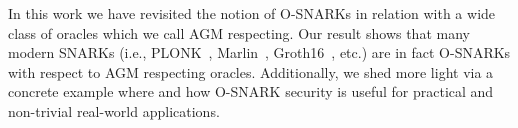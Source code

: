 In this work we have revisited the notion of O-SNARKs in relation with a wide class of oracles which we call AGM 
respecting. Our result shows that many modern SNARKs (i.e., PLONK~\cite{plonk}, Marlin~\cite{marlin}, Groth16~\cite{groth16}, etc.) 
are in fact O-SNARKs with respect to AGM respecting oracles. Additionally, we shed more light via a concrete 
example where and how O-SNARK security is useful for practical and non-trivial real-world applications. 


